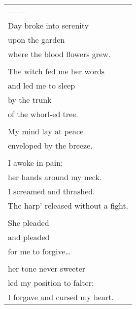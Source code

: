 \documentclass{article}
\begin{document}
\begin{tabular}{l}
\\
--- --- \\
Day broke into serenity \\
upon the garden \\
where the blood flowers grew. \\
\\
The witch fed me her words \\
and led me to sleep \\
by the trunk \\
of the whorl-ed tree. \\
\\
My mind lay at peace \\
enveloped by the breeze. \\
\\
I awoke in pain; \\
her hands around my neck. \\
I screamed and thrashed. \\
The harp' released without a fight. \\
\\
She pleaded \\
and pleaded \\
for me to forgive\ldots{} \\
\\
her tone never sweeter \\
led my position to falter; \\
I forgave and cursed my heart. \\
\end{tabular} \\
\end{document}
